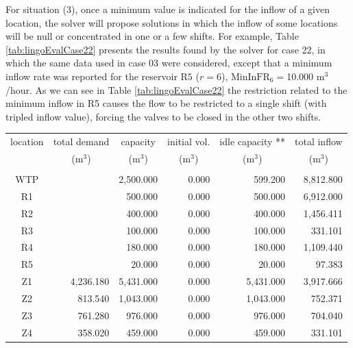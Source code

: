 \documentclass{singlecol}
\theoremstyle{TH}{
\newtheorem{lemma}{Lemma}
\newtheorem{theorem}[lemma]{Theorem}
\newtheorem{corrolary}[lemma]{Corrolary}
\newtheorem{conjecture}[lemma]{Conjecture}
\newtheorem{proposition}[lemma]{Proposition}
\newtheorem{claim}[lemma]{Claim}
\newtheorem{stheorem}[lemma]{Wrong Theorem}
\newtheorem{algorithm}{Algorithm}
}
\theoremstyle{THrm}{
\newtheorem{definition}{Definition}[section]
\newtheorem{question}{Question}[section]
\newtheorem{remark}{Remark}
\newtheorem{scheme}{Scheme}
}
\theoremstyle{THhit}{
\newtheorem{case}{Case}[section]
}
\begin{document}
For situation (3), once a minimum value is indicated for the inflow of a given location, the solver will propose solutions in which the inflow of some locations will be null or concentrated in one or a few shifts. For example, Table \ref{tab:lingoEvalCase22} presents the results found by the solver for case 22, in which the same data used in case 03 were considered, except that a minimum inflow rate was reported for the reservoir $\mathrm{R5}$ ($r=6$), $\mathrm{MinInFR}_6 = $10.000 $\mathrm{m^3}$/hour. As we can see in Table \ref{tab:lingoEvalCase22} the restriction related to the minimum inflow in R5 causes the flow to be restricted to a single shift (with tripled inflow value), forcing the valves to be closed in the other two shifts.

\begin{table}[h!]
\begin{center}
\begin{small}
	\begin{tabular}{ c r r r r r } 
		location & \multicolumn{1}{c}{total demand}      & \multicolumn{1}{c}{capacity} & \multicolumn{1}{c}{initial vol.} & \multicolumn{1}{c}{idle capacity **} & \multicolumn{1}{c}{total inflow}  \\
		      & \multicolumn{1}{c}{($\mathrm{m^3}$)} & \multicolumn{1}{c}{($\mathrm{m^3}$)}   & \multicolumn{1}{c}{($\mathrm{m^3}$)}     &  \multicolumn{1}{c}{($\mathrm{m^3}$)}   &  \multicolumn{1}{c}{($\mathrm{m^3}$)}               \\
		\\
		WTP   &           & 2,500.000 & 0.000 &  599.200 & 8,812.800 \\
		R1    &           &   500.000 & 0.000 &  500.000 & 6,912.000\\
		R2    &           &   400.000 & 0.000 &  400.000 & 1,456.411 \\
		R3    &           &   100.000 & 0.000 &  100.000 &   331.101 \\
	    R4    &           &   180.000 & 0.000 &  180.000 & 1,109.440  \\
	    R5    &           &    20.000 & 0.000 &   20.000 &    97.383 \\
	    Z1    & 4,236.180 & 5,431.000 & 0.000 &  5,431.000 & 3,917.666 \\
	    Z2    &   813.540 & 1,043.000 & 0.000 &  1,043.000 &   752.371 \\
	    Z3    &   761.280 &   976.000 & 0.000 &    976.000 &   704.040 \\
	    Z4    &   358.020 &   459.000 & 0.000 &    459.000 &   331.101 \\

\end{tabular}
\end{small}
\end{center}
\end{table}
\end{document}
